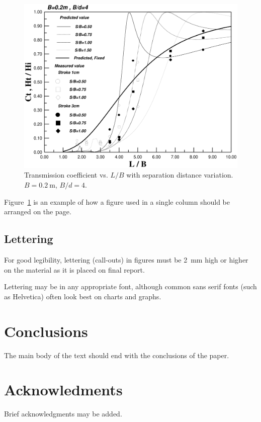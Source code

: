 \documentclass[bibtex,pagenumbers]{stabs2021}
\begin{document}
\begin{figure}
    \centering
    \includegraphics[width=\columnwidth]{stabsgraph.png}
    \caption{Transmission coefficient vs. $L/B$ with separation distance variation. $B = 0.2\ \mathrm{m}$, $B/d = 4$.}
    \label{fig:example-figure}
\end{figure}
Figure~\ref{fig:example-figure} is an example of how a figure used in a single column should be arranged on the page.

\subsection{Lettering}

For good legibility, lettering (call-outs) in figures must be 2~mm high or higher on the material as it is placed on final report. 

Lettering may be in any appropriate font, although common sans serif fonts (such as Helvetica) often look best on charts and graphs.

\section{Conclusions}

The main body of the text should end with the conclusions of the paper.

\section{Acknowledments}

Brief acknowledgments may be added.
\end{document}
